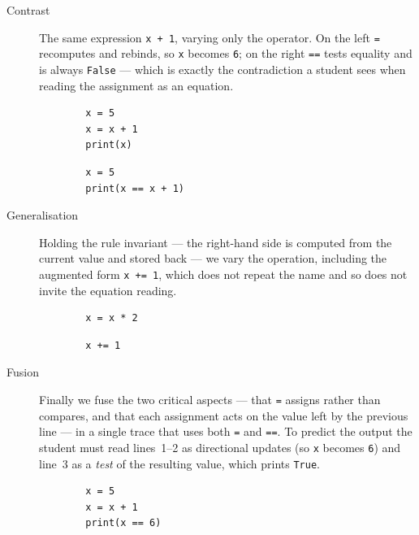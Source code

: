 \begin{description}
  \item[Contrast] The same expression \texttt{x + 1}, varying only
    the operator. On the left \texttt{=} recomputes and rebinds, so
    \texttt{x} becomes \texttt{6}; on the right
    \texttt{==} tests equality and is always
    \texttt{False} --- which is exactly the contradiction a student
    sees when reading the assignment as an equation.

    \hfill
    \begin{minipage}[t]{0.45\columnwidth}
      \begin{verbatim}
        x = 5
        x = x + 1
        print(x)
      \end{verbatim}
    \end{minipage}
    \hfill
    \begin{minipage}[t]{0.45\columnwidth}
      \begin{verbatim}
        x = 5
        print(x == x + 1)
      \end{verbatim}
    \end{minipage}

  \item[Generalisation] Holding the rule invariant --- the right-hand side is
    computed from the current value and stored back --- we vary the operation,
    including the augmented form \texttt{x += 1}, which does not
    repeat the name and so does not invite the equation reading.

    \hfill
    \begin{minipage}[t]{0.45\columnwidth}
      \begin{verbatim}
        x = x * 2
      \end{verbatim}
    \end{minipage}
    \hfill
    \begin{minipage}[t]{0.45\columnwidth}
      \begin{verbatim}
        x += 1
      \end{verbatim}
    \end{minipage}

  \item[Fusion] Finally we fuse the two critical aspects --- that
    \texttt{=} assigns rather than compares, and that each assignment
    acts on the value left by the previous line --- in a single trace that uses
    both \texttt{=} and \texttt{==}. To predict the
    output the student must read lines~1--2 as directional updates (so
    \texttt{x} becomes \texttt{6}) and line~3 as a
    \emph{test} of the resulting value, which prints \texttt{True}.

    \hfill
    \begin{minipage}[t]{0.5\columnwidth}
      \begin{verbatim}
        x = 5
        x = x + 1
        print(x == 6)
      \end{verbatim}
    \end{minipage}
\end{description}

